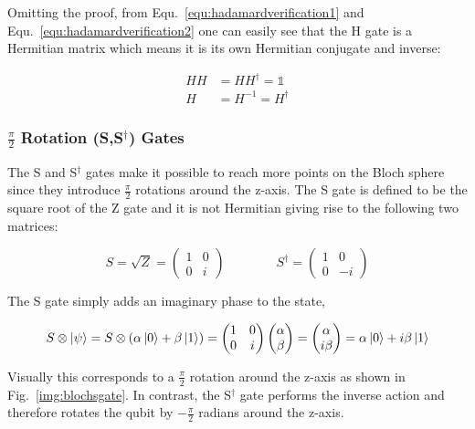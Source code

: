 Omitting the proof, from Equ.~\ref{equ:hadamardverification1} and Equ.~\ref{equ:hadamardverification2} one can easily see that the H gate is a Hermitian matrix which means it is its own Hermitian conjugate and inverse:

\begin{align}
HH &= HH^\dagger = \mathbb{1} \\
H &= H^{-1} = H^\dagger
\end{align}

\subsubsection{$\frac{\pi}{2}$ Rotation (S,S$^\dagger$) Gates}
\label{subsubsubsec:cliffordgates}

The S and S$^\dagger$ gates make it possible to reach more points on the Bloch sphere since they introduce $\frac{\pi}{2}$ rotations around the z-axis. The S gate is defined to be the square root of the Z gate and it is not Hermitian giving rise to the following two matrices: 

\begin{equation}
S = \sqrt{Z} = \begin{pmatrix}
 1 & 0 \\ 
 0 & i
 \end{pmatrix}
 \quad \quad \quad \quad
S^\dagger = \begin{pmatrix}
 1 & 0 \\ 
 0 & -i
 \end{pmatrix}
\end{equation}

The S gate simply adds an imaginary phase to the \1 state,

\begin{equation}
\label{equ:sverification}
S \otimes \ket{\psi} = S \otimes (\alpha \ket{0} + \beta \ket{1}) = \begin{pmatrix}
 1 & 0 \\ 
 0 & i
 \end{pmatrix} \begin{pmatrix}
 \alpha  \\ 
 \beta
 \end{pmatrix} = \begin{pmatrix}
 \alpha  \\ 
 i\beta
 \end{pmatrix} = \alpha \ket{0} + i\beta \ket{1}
\end{equation}

Visually this corresponds to a $\frac{\pi}{2}$ rotation around the z-axis as shown in Fig.~\ref{img:blochsgate}. In contrast, the S$^\dagger$ gate performs the inverse action and therefore rotates the qubit by $-\frac{\pi}{2}$ radians around the z-axis.

